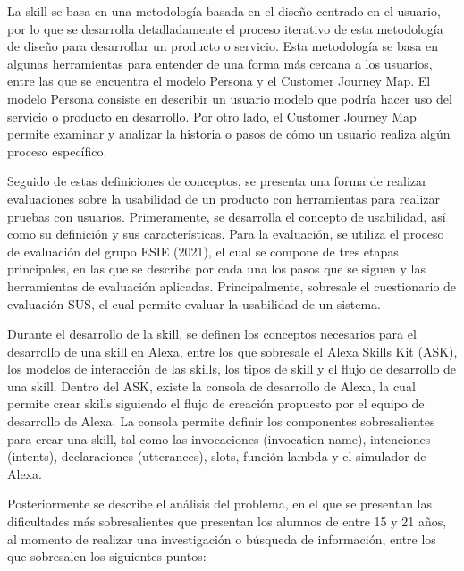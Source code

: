 La skill se basa en una metodología basada en el diseño centrado en el usuario, por lo que se desarrolla detalladamente el proceso iterativo de esta metodología de diseño para desarrollar un producto o servicio. Esta metodología se basa en algunas herramientas para entender de una forma más cercana a los usuarios, entre las que se encuentra el modelo Persona y el Customer Journey Map. El modelo Persona consiste en describir un usuario modelo que podría hacer uso del servicio o producto en desarrollo. Por otro lado, el Customer Journey Map permite examinar y analizar la historia o pasos de cómo un usuario realiza algún proceso específico.

Seguido de estas definiciones de conceptos, se presenta una forma de realizar evaluaciones sobre la usabilidad de un producto con herramientas para realizar pruebas con usuarios. Primeramente, se desarrolla el concepto de usabilidad, así como su definición y sus características. Para la evaluación, se utiliza el proceso de evaluación del grupo ESIE (2021), el cual se compone de tres etapas principales, en las que se describe por cada una los pasos que se siguen y las herramientas de evaluación aplicadas. Principalmente, sobresale el cuestionario de evaluación SUS, el cual permite evaluar la usabilidad de un sistema.

Durante el desarrollo de la skill, se definen los conceptos necesarios para el desarrollo de una skill en Alexa, entre los que sobresale el Alexa Skills Kit (ASK), los modelos de interacción de las skills, los tipos de skill y el flujo de desarrollo de una skill. Dentro del ASK, existe la consola de desarrollo de Alexa, la cual permite crear skills siguiendo el flujo de creación propuesto por el equipo de desarrollo de Alexa. La consola permite definir los componentes sobresalientes para crear una skill, tal como las invocaciones (invocation name), intenciones (intents), declaraciones (utterances), slots, función lambda y el simulador de Alexa.

Posteriormente se describe el análisis del problema, en el que se presentan las dificultades más sobresalientes que presentan los alumnos de entre 15 y 21 años, al momento de realizar una investigación o búsqueda de información, entre los que sobresalen los siguientes puntos:

